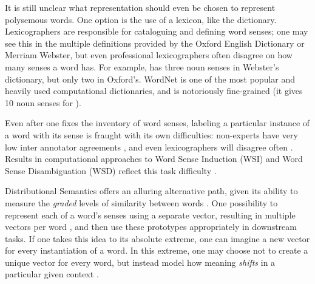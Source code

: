 It is still unclear what representation should even be chosen
to represent polysemous words. One option is the use of a lexicon, like the
dictionary.  Lexicographers are responsible for cataloguing and defining word
senses; one may see this in the multiple definitions provided by the Oxford
English Dictionary or Merriam Webster, but even professional lexicographers
often disagree on how many senses a word has. For example,  has
three noun senses in Webster's dictionary, but only two in Oxford's.
WordNet \cite{miller:1995:acm} is one of the most popular and heavily used
computational dictionaries, and is notoriously fine-grained (it gives 10
noun senses for ).

Even after one fixes the inventory of word senses, labeling a particular
instance of a word with its sense is fraught with its own difficulties:
non-experts have very low inter annotator agreements \cite{yong:1999:siglex},
and even lexicographers will disagree often \cite{kilgarriff:2000:ch}.
Results in computational approaches to Word Sense Induction (WSI) and Word
Sense Disambiguation (WSD) reflect this task difficulty \cite{mccarthy:2009:llc,navigli:2009:csur}.

Distributional Semantics offers an alluring alternative path, given its ability
to measure the {\em graded} levels of similarity between words
\cite{erk:2008:emnlp}.  One possibility to represent each of a word's senses
using a separate vector, resulting in multiple vectors per word
\cite{reisinger:2010:naacl,huang:2012:acl}, and then use
these prototypes appropriately in downstream tasks. If one takes this idea to
its absolute extreme, one can imagine a new vector for every instantiation of a
word. In this extreme, one may choose not to create a unique vector for every
word, but instead model how meaning {\em shifts} in a particular given context
\cite{erk:2008:emnlp,erk:2010:gems}.


